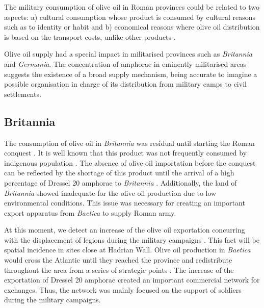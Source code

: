 \documentclass[review]{elsarticle}
\newcommand{\memo}[2]{\textcolor{#1}{#2}}
\newcommand{\xavi}[1]{\memo{magenta}{XRC: #1\\}}
\begin{document}
 
The military consumption of olive oil in Roman provinces could be related to two aspects: a) cultural consumption whose product is consumed by cultural reasons such as to identity or habit and b) economical reasons where olive oil distribution is based on the transport costs, unlike other products \citep[69-70]{carreras_britannia_1998}. 

Olive oil supply had a special impact in militarised provinces such as \textit{Britannia} and \textit{Germania}. The concentration of amphorae in eminently militarised areas suggests the existence of a broad supply mechanism, being accurate to imagine a possible organisation in charge of its distribution from military camps to civil settlements\citep{remesal_annona_1986, carreras_britannia_1998}.

 



\subsection{Britannia}

The consumption of olive oil in \textit{Britannia} was residual until starting the Roman conquest \citep{funari_corpus_1996,
carreras_abastecimiento_2003}. It is well known that this product was not frequently consumed by indigenous population \citep[161]{monfort_britanniaen_1998}. The absence of olive oil importation before the conquest can be reflected by the shortage of this product until the arrival of a high percentage of Dressel 20 amphorae to \textit{Britannia} \citep[1]{carreras_britannia_1998}. Additionally, the land of \textit{Britannia} showed inadequate for the olive oil production due to low environmental conditions. This issue was necessary for creating an important export apparatus from \textit{Baetica} to supply Roman army.

At this moment, we detect an increase of the olive oil exportation concurring with the displacement of legions during the military campaigns \citep[161]{monfort_britanniaen_1998}. This fact will be spatial incidence in sites close at Hadrian Wall.  
Olive oil production in \textit{Baetica} would cross the Atlantic until they reached the province and redistribute throughout the area from a series of strategic points \citep{carreras_atlantic_2012}. The increase of the exportation of Dressel 20 amphorae created an important commercial network for exchanges. Thus, the network was mainly focused on the support of soldiers during the military campaigns. 
\end{document}

